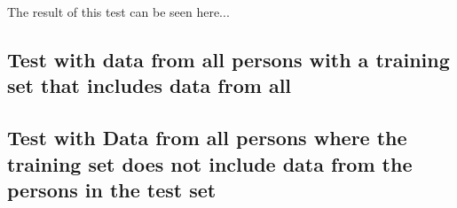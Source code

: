  The result of this test can be seen here...
 

\subsection{Test with data from all persons with a training set that includes 
data from all}


 

\subsection{Test with Data from all persons where the training set does not 
include data from 
the persons in the test set}





